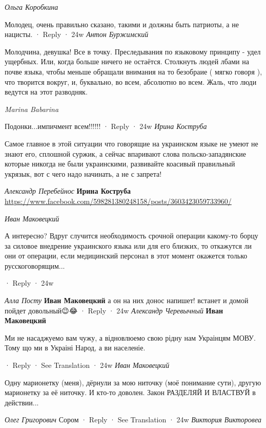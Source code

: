 \begin{itemize}
\emph{Ольга Коробкина}

Молодец, очень правильно сказано, такими и должны быть патриоты, а не нацисты.
 · Reply · 24w
\emph{Антон Буржимский}

Молодчина, девушка! Все в точку. Преследывания по языковому принципу - удел
ущербных. Или, когда больше ничего не остаётся. Столкнуть людей лбами на почве
языка, чтобы меньше обращали внимания на то безобраие ( мягко говоря ), что
творится вокруг, и, буквально, во всем, абсолютно во всем. Жаль, что люди
ведутся на этот разводняк.

\emph{Marina Babarina}

Подонки...импичмент всем!!!!!!
 · Reply · 24w
\emph{Ирина Коструба}

Самое главное в этой ситуации что говорящие на украинском языке не умеют не
знают его, сплошной суржик, а сейчас впаривают слова польско-западянские
которые никогда не были украинскими, развивайте коасивый правильный укрязык,
вот с чего надо начинать, а не с запрета!

\begin{itemize}
\emph{Александр Перебейнос}
\textbf{Ирина Коструба} \url{https://www.facebook.com/598281380248158/posts/3603423059733960/}
\end{itemize}

\emph{Иван Маковецкий}

А интересно? Вдруг случится необходимость срочной операции какому-то борцу за
силовое внедрение украинского языка или для его близких, то откажутся ли они от
операции, если медицинский персонал в этот момент окажется только
русскоговорящим...

 · Reply · 24w

\begin{itemize}
\emph{Алла Посту}
\textbf{Иван Маковецкий} а он на них донос напишет! встанет и домой пойдет довольный😉😂
 · Reply · 24w
\emph{Александр Черевычный}
\textbf{Иван Маковецкий} 

Ми не насаджуемо вам чужу, а відновлюемо свою рідну нам Украінцям МОВУ. Тому що
ми в Украіні Народ, а ви населеніе.

 · Reply · See Translation · 24w
\emph{Иван Маковецкий}

Одну марионетку (меня), дёрнули за мою ниточку (моё понимание сути), другую
марионетку за её ниточку. И кто-то доволен. Закон РАЗДЕЛЯЙ И ВЛАСТВУЙ в
действии...

\end{itemize}

\emph{Олег Григорович}
Сором
 · Reply · See Translation · 24w
\emph{Виктория Викторовеа}


\end{itemize}

